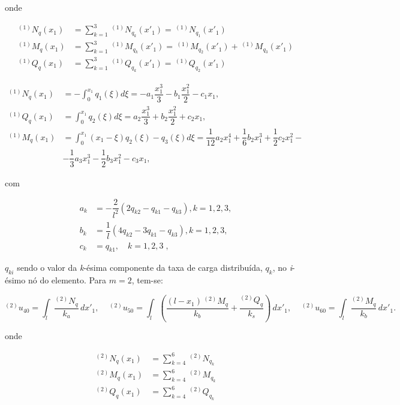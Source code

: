 onde

\begin{align}
	^{(1)}N_q(x_1)
	 & = \sum_{k=1}^3\, ^{(1)}N_{q_k}(x'_1) = \,^{(1)}N_{q_1}(x'_1)                       \nonumber   \\
	^{(1)}M_q(x_1)
	 & = \sum_{k=1}^3\, ^{(1)}M_{q_k}(x'_1) = \,^{(1)}M_{q_2}(x'_1) + \,^{(1)}M_{q_3}(x'_1) \nonumber \\
	^{(1)}Q_q(x_1)
	 & = \sum_{k=1}^3\, ^{(1)}Q_{q_k}(x'_1) = \,^{(1)}Q_{q_2}(x'_1)
\end{align}

\begin{align}
	^{(1)}N_q(x_1)
	 & = -\int_0^{x_1} q_1(\xi)d\xi = -a_1 \dfrac{x_1^3}{3} - b_1 \dfrac{x_1^2}{2} - c_1x_1,                                                \\
	^{(1)}Q_q(x_1)
	 & = \int_0^{x_1} q_2(\xi)d\xi = a_2 \dfrac{x_1^3}{3} + b_2 \dfrac{x_1^2}{2} + c_2 x_1,                                                 \\
	^{(1)}M_q(x_1)
	 & = \int_0^{x_1} (x_1-\xi)q_2(\xi) - q_3(\xi)d\xi = \dfrac{1}{12}a_2x_1^4 + \dfrac{1}{6}b_2x_1^3 + \dfrac{1}{2}c_2x_1^2 - \, \nonumber \\
	 & -\dfrac{1}{3}a_3x_1^3 - \dfrac{1}{2} b_3x_1^2 - c_3x_1,
\end{align}

com

\begin{align}
	a_k & = -\dfrac{2}{l^2}(2q_{k2} - q_{k1} - q_{k3}), k=1,2,3, \\
	b_k & = \dfrac{1}{l}(4q_{k2} - 3q_{k1} - q_{k3}), k=1,2,3,   \\
	c_k & = q_{k1}, \quad k=1,2,3 \;,
\end{align}

\noindent $q_{ki}$ sendo o valor da \textit{k}-ésima componente da taxa de carga distribuída, $q_k$, no \textit{i}-ésimo nó do elemento.
Para $m=2$, tem-se:

\begin{equation}
	^{(2)}u_{40} = \int_l \dfrac{^{(2)}N_q}{k_a}\,
	dx'_1,\, \quad
	^{(2)}u_{50} = \int_l \left( \dfrac{(l-x_1)\, ^{(2)}M_q}{k_b} + \dfrac{^{(2)}Q_q}{k_s}\right)\, dx'_1,\, \quad
	^{(2)}u_{60} = \int_l \dfrac{^{(2)}M_q}{k_b}\,dx'_1.\,
\end{equation}

onde

\begin{align}
^{(2)}N_q(x_1)       & = \sum_{k=4}^6\, ^{(2)}N_{q_k} \nonumber \\
                    ^{(2)}M_q(x_1) & = \sum_{k=4}^6\, ^{(2)}M_{q_k} \nonumber \\
                    ^{(2)}Q_q(x_1) & = \sum_{k=4}^6\, ^{(2)}Q_{q_k}
\end{align}

